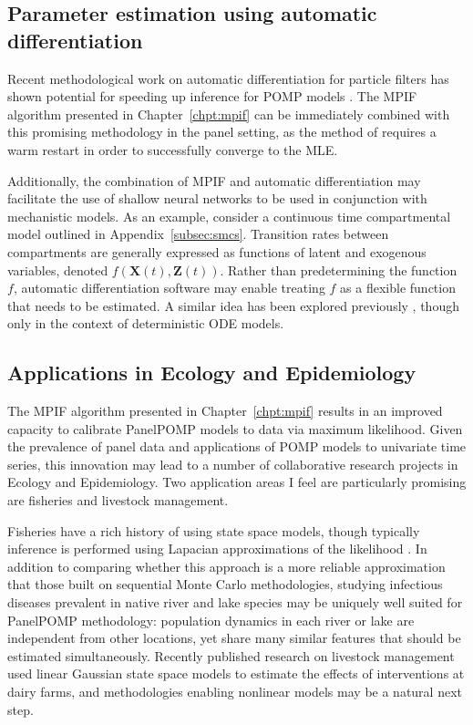 \subsection*{Parameter estimation using automatic differentiation}

Recent methodological work on automatic differentiation for particle filters has shown potential for speeding up inference for POMP models \citep{tan24}.
The MPIF algorithm presented in Chapter~\ref{chpt:mpif} can be immediately combined with this promising methodology in the panel setting, as the method of \citet{tan24} requires a warm restart in order to successfully converge to the MLE.

Additionally, the combination of MPIF and automatic differentiation may facilitate the use of shallow neural networks to be used in conjunction with mechanistic models.
As an example, consider a continuous time compartmental model outlined in Appendix~\ref{subsec:smcs}.
Transition rates between compartments are generally expressed as functions of latent and exogenous variables, denoted $f(\bm{X}(t), \bm{Z}(t))$.
Rather than predetermining the function $f$, automatic differentiation software may enable treating $f$ as a flexible function that needs to be estimated.
A similar idea has been explored previously \citep{noordijk24,dandekar20}, though only in the context of deterministic ODE models. 

\subsection*{Applications in Ecology and Epidemiology}

The MPIF algorithm presented in Chapter~\ref{chpt:mpif} results in an improved capacity to calibrate PanelPOMP models to data via maximum likelihood.
Given the prevalence of panel data and applications of POMP models to univariate time series, this innovation may lead to a number of collaborative research projects in Ecology and Epidemiology.
Two application areas I feel are particularly promising are fisheries and livestock management.

Fisheries have a rich history of using state space models, though typically inference is performed using Lapacian approximations of the likelihood \citep[e.g.,][]{auger17}.
In addition to comparing whether this approach is a more reliable approximation that those built on sequential Monte Carlo methodologies, studying infectious diseases prevalent in native river and lake species may be uniquely well suited for PanelPOMP methodology: population dynamics in each river or lake are independent from other locations, yet share many similar features that should be estimated simultaneously.
Recently published research on livestock management \citep{skolstrup22} used linear Gaussian state space models to estimate the effects of interventions at dairy farms, and methodologies enabling nonlinear models may be a natural next step. 

